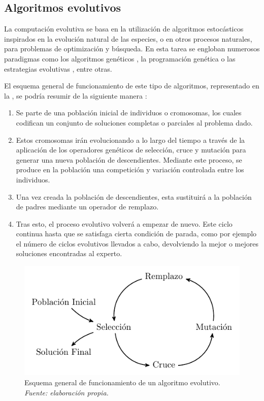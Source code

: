\documentclass[c5paper,10pt,twoside]{book}	   	%
\begin{document}
\subsection{Algoritmos evolutivos}

La computación evolutiva \cite{Hol75,Gol89} se basa en la utilización de algoritmos estocásticos inspirados en la evolución natural de las especies, o en otros procesos naturales, para problemas de optimización y búsqueda. En esta tarea se engloban numerosos paradigmas como los algoritmos genéticos \cite{Gol89}, la programación genética \cite{Koza92,Koza94} o las estrategias evolutivas \cite{Schwefel95}, entre otras.


El esquema general de funcionamiento de este tipo de algoritmos, representado en la , se podría resumir de la siguiente manera \cite{Mic92}: 

\begin{enumerate}
	\item Se parte de una población inicial de individuos o cromosomas, los cuales codifican un conjunto de soluciones completas o parciales al problema dado.
	
	\item Estos cromosomas irán evolucionando a lo largo del tiempo a través de la aplicación de los operadores genéticos de selección, cruce y mutación para generar una nueva población de descendientes. Mediante este proceso, se produce en la población una competición y variación controlada entre los individuos.
	
	\item Una vez creada la población de descendientes, esta sustituirá a la población de padres mediante un operador de remplazo.
	
	\item Tras esto, el proceso evolutivo volverá a empezar de nuevo. Este ciclo continua hasta que se satisfaga cierta condición de parada, como por ejemplo el número de ciclos evolutivos llevados a cabo, devolviendo la mejor o mejores soluciones encontradas al experto.
\end{enumerate}



\begin{figure}[!hbtp]
	\centering
	\includegraphics[width=0.8\linewidth]{./Figures/genetico_esquema.pdf}
	\caption[Esquema general de funcionamiento de un algoritmo evolutivo.]{Esquema general de funcionamiento de un algoritmo evolutivo. \textit{Fuente: elaboración propia.}}	
	\label{fig:evolutivo}
\end{figure}
\end{document}
